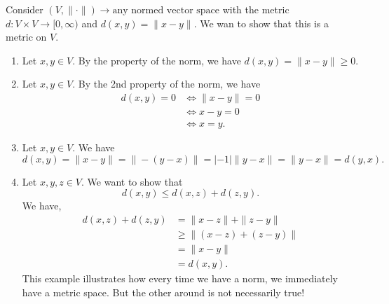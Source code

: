 \documentclass[a4paper]{report}
\begin{document}
\begin{eg}
    Consider \( (V, \| \cdot \|) \to \text{any normed vector space} \) with the metric \( d: V \times V \to [0,\infty ) \) and \( d(x,y) = \| x - y \| \).
    We wan to show that this is a metric on \( V  \). 
    \begin{enumerate}
        \item[(i)] Let \( x,y \in V  \). By the property of the norm, we have \( d(x,y) = \| x - y \| \geq 0  \).
        \item[(ii)] Let \( x,y \in V  \). By the 2nd property of the norm, we have 
            \begin{align*}
                d(x,y ) = 0 &\iff \| x - y \| = 0  \\
                            &\iff x - y = 0 \\
                            &\iff x = y. 
            \end{align*}
        \item[(iii)] Let \( x,y \in V  \). We have
            \[  d(x,y) = \| x - y \| = \| - (y - x)\| = |  - 1 | \| y - x \| = \| y - x \| = d(y,x).  \]
        \item[(iv)] Let \( x,y,z \in V  \). We want to show that 
            \[  d(x,y) \leq d(x,z) + d(z,y). \]
            We have,
            \begin{align*}
                d(x,z) + d(z,y) &= \|x - z \| + \|z - y\| \\
                                &\geq \| (x-z) + (z-y) \| \\
                                &= \|x  - y\| \\
                                &= d(x,y).
            \end{align*}
    This example illustrates how every time we have a norm, we immediately have a metric space. But the other around is not necessarily true!
    \end{enumerate}
\end{eg}
\end{document}
